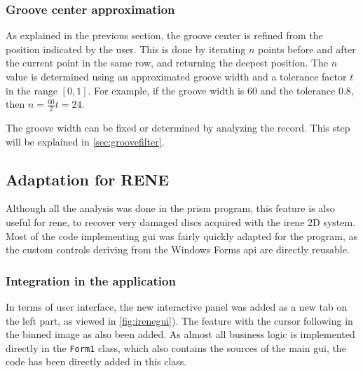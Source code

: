 \subsubsection{Groove center approximation}
\label{sec:centerapprox}

As explained in the previous section, the groove center is refined from the position indicated by the user. This is done by iterating $n$ points before and after the current point in the same row, and returning the deepest position. The $n$ value is determined using an approximated groove width and a tolerance factor $t$ in the range $[0,1]$. For example, if the groove width is $60$ and the tolerance $0.8$, then $n = \frac{60}{2} t = 24$.

The groove width can be fixed or determined by analyzing the record. This step will be explained in \autoref{sec:groovefilter}.

\subsection{Adaptation for RENE}

Although all the analysis was done in the \gls{prism} program, this feature is also useful for \gls{rene}, to recover very damaged discs acquired with the \gls{irene} 2D system. Most of the code implementing \gls{gui} was fairly quickly adapted for the program, as the custom controls deriving from the Windows Forms \gls{api} are directly reusable.

\subsubsection{Integration in the application}

In terms of user interface, the new interactive panel was added as a new tab on the left part, as viewed in \autoref{fig:irenegui}). The feature with the cursor following in the binned image as also been added. As almost all business logic is implemented directly in the \texttt{Form1} class, which also contains the sources of the main \gls{gui}, the code has been directly added in this class.

